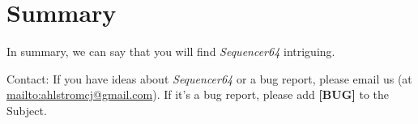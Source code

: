 \documentclass[
 11pt,
 twoside,
 a4paper,
 headinclude,
 footinclude,
 final                                 %
]{article}
\begin{document}

\rhead{\rightmark}         %











































\section{Summary}
\label{sec:summary}

   In summary, we can say that you will find \textsl{Sequencer64} intriguing.

   Contact: If you have ideas about \textsl{Sequencer64} or a bug report, please
   email us (at \url{mailto:ahlstromcj@gmail.com}).
   If it's a bug report, please add \textbf{[BUG]} to the Subject.




\printindex
\end{document}
